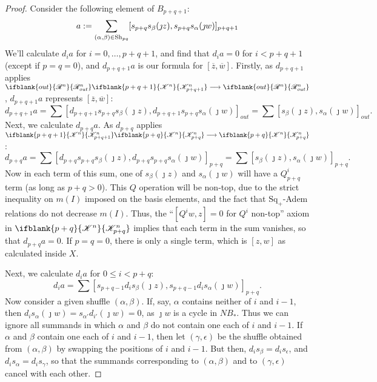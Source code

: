\documentclass[11pt]{article}
\newcommand{\PRLie}[1]{\scrR^{#1}}%
\newcommand{\LL}[1]{{\scrK}^{#1}}%
\newcommand{\Fr}[2][]{\ifblank{#1}{#2}{#2_{#1}}}
\renewcommand{\Q}{Q}
\newcommand{\SqShift}{\Sq_{+}}
\newcommand{\Sq}{\mathrm{Sq}}
\newcommand{\minDim}{m}
\newcommand{\Shuffles}[2]{\textup{Sh}_{#1#2}}
\begin{document}
\begin{LieLambdaStructureOnKoszul}
\begin{proof}
Consider the following element of $B_{p+q+1}$:
\[a:=\sum_{(\alpha,\beta)\in\Shuffles{p}{q}}[s_{p+q}s_\beta(\jmath z), s_{p+q}s_\alpha(\jmath w)]_{p+q+1}\]
We'll calculate $d_ia$ for $i=0,\ldots,p+q+1$, and find that $d_ia=0$ for $i<p+q+1$ (except if $p=q=0$), and $d_{p+q+1}a$ is our formula for $[\overline{z},\overline{w}]$. Firstly, as $d_{p+q+1}$ applies $\Fr[out]{\PRLie{n}}\Fr[p+q+1]{\LL{n}}\to\Fr[out]{\PRLie{n}}$, $d_{p+q+1}a$ represents $[\overline{z},\overline{w}]$:
\[d_{p+q+1}a=\sum [d_{p+q+1}s_{p+q}s_\beta(\jmath z), d_{p+q+1}s_{p+q}s_\alpha(\jmath w)]_{out}=\sum [s_\beta(\jmath z), s_\alpha(\jmath w)]_{out}.\]
Next, we calculate $d_{p+q}a$. As $d_{p+q}$ applies $\Fr[p+q+1]{\LL{n}}\Fr[p+q]{\LL{n}}\to\Fr[p+q]{\LL{n}}$:
\[d_{p+q}a=\sum [d_{p+q}s_{p+q}s_\beta(\jmath z), d_{p+q}s_{p+q}s_\alpha(\jmath w)]_{p+q}=\sum [s_\beta(\jmath z), s_\alpha(\jmath w)]_{p+q}.\]
Now in each term of this sum, one of $s_\beta(\jmath z)$ and $s_\alpha(\jmath w)$ will have a $\Q_{p+q}^i$ term (as long as $p+q>0$). This $\Q$ operation will be non-top, due to the strict inequality on $\minDim(I)$ imposed on the basis elements, and the fact that $\SqShift$-Adem relations do not decrease $\minDim(I)$. Thus, the ``$[Q^iw,z]=0$ for $Q^i$ non-top'' axiom in $\Fr[p+q]{\LL{n}}$ implies that each term in the sum vanishes, so that $d_{p+q}a=0$. If $p=q=0$, there is only a single term, which is $[z,w]$ as calculated inside $X$.

Next, we calculate $d_{i}a$ for $0\leq i< p+q$:
\[d_{i}a=\sum [s_{p+q-1}d_{i}s_\beta(\jmath z), s_{p+q-1}d_{i}s_\alpha(\jmath w)]_{p+q}.\]
Now consider a given shuffle $(\alpha,\beta)$. If, say, $\alpha$ contains neither of $i$ and $i-1$, then $d_is_\alpha(\jmath w)=s_{\alpha'}d_{i'}(\jmath w)=0$, as $\jmath w$ is a cycle in $NB_*$. Thus we can ignore all summands in which $\alpha$ and $\beta$ do not contain one each of $i$ and $i-1$.
If $\alpha$ and $\beta$ contain one each of $i$ and $i-1$, then let $(\gamma,\epsilon)$ be the shuffle obtained from $(\alpha,\beta)$ by swapping the positions of $i$ and $i-1$. But then, $d_is_\beta=d_is_{\epsilon}$, and $d_is_\alpha=d_is_{\gamma}$, so that the summands corresponding to $(\alpha,\beta)$ and to $(\gamma,\epsilon)$ cancel with each other.
\end{proof}

\end{LieLambdaStructureOnKoszul}
\end{document}
